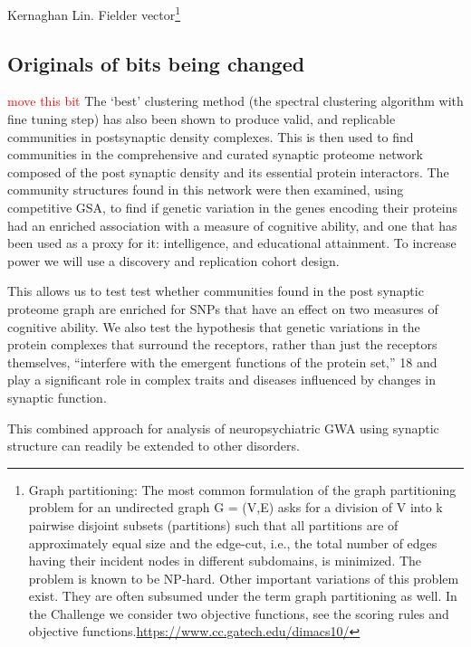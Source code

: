 Kernaghan Lin. Fielder vector\footnote{Graph partitioning:
The most common formulation of the graph partitioning problem for an undirected graph G = (V,E) asks for a division of V into k pairwise disjoint subsets (partitions) such that all partitions are of approximately equal size and the edge-cut, i.e., the total number of edges having their incident nodes in different subdomains, is minimized. The problem is known to be NP-hard. Other important variations of this problem exist. They are often subsumed under the term graph partitioning as well. In the Challenge we consider two objective functions, see the scoring rules and objective functions.\url{https://www.cc.gatech.edu/dimacs10/}}
\subsection{Originals of bits being changed}


\textcolor{red}{move this bit}
The `best' clustering method (the spectral clustering algorithm with fine tuning step\cite{mclean2016improved}) has also been shown to produce valid, and replicable communities in postsynaptic density complexes\cite{mclean2016improved}. This is then used to find communities in the  comprehensive and curated synaptic proteome network composed of the post synaptic density and its essential protein interactors. The community structures found in this network were then examined, using competitive GSA, to find if genetic variation in the genes encoding their proteins had an enriched association with a measure of cognitive ability, and one that has been used as a proxy for it: intelligence, and educational attainment. To increase power we will use a discovery and replication cohort design. 

 This  allows us to test test whether communities found in the post synaptic proteome graph are enriched for SNPs that have an effect on two measures of cognitive ability. We also test the hypothesis that genetic variations in the protein complexes that surround the receptors, rather than just the receptors themselves, “interfere with the emergent functions of the protein set‚” 18  and play  a significant role in complex traits and diseases influenced by changes in synaptic function. 

This combined approach for analysis of neuropsychiatric GWA using synaptic structure can readily be extended to other disorders. 

